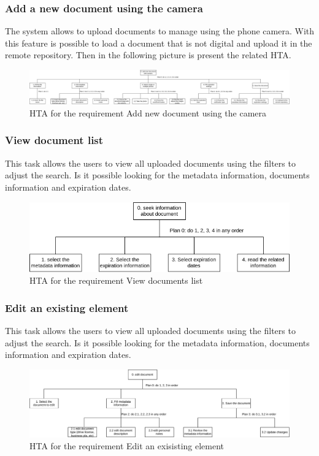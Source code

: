 \subsubsection{Add a new document using the camera}
The system allows to upload documents to manage using the phone camera. With this feature is possible to load a document that is not digital and upload it in the remote repository. Then in the following picture is present the related HTA.
\begin{figure}[H]
	\centering
	\includegraphics[width=\textwidth]{../Draw.io diagrams/add_new_document_camera.drawio.png}  %
	\caption{HTA for the requirement Add new document using the camera}
\end{figure}
\subsubsection{View document list}
This task allows the users to view all uploaded documents using the filters to adjust the search. Is it possible looking for the metadata information, documents information and expiration dates.
\begin{figure}[H]
	\centering
	\includegraphics[width=\textwidth]{../Draw.io diagrams/search_and_view_documents.drawio.png}  %
	\caption{HTA for the requirement View documents list}
\end{figure}
\subsubsection{Edit an existing element}
This task allows the users to view all uploaded documents using the filters to adjust the search. Is it possible looking for the metadata information, documents information and expiration dates.
\begin{figure}[H]
	\centering
	\includegraphics[width=\textwidth]{../Draw.io diagrams/edit_document.drawio.png}  %
	\caption{HTA for the requirement Edit an exisisting element}
\end{figure}
